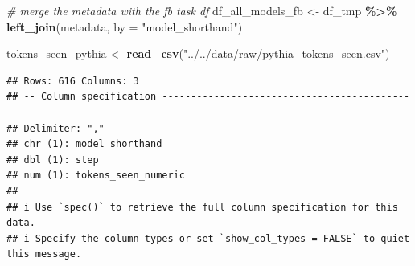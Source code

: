 \documentclass[
]{article}
\newenvironment{Shaded}{\begin{snugshade}}{\end{snugshade}}
\newcommand{\AttributeTok}[1]{\textcolor[rgb]{0.13,0.29,0.53}{#1}}
\newcommand{\CommentTok}[1]{\textcolor[rgb]{0.56,0.35,0.01}{\textit{#1}}}
\newcommand{\FunctionTok}[1]{\textcolor[rgb]{0.13,0.29,0.53}{\textbf{#1}}}
\newcommand{\NormalTok}[1]{#1}
\newcommand{\OtherTok}[1]{\textcolor[rgb]{0.56,0.35,0.01}{#1}}
\newcommand{\SpecialCharTok}[1]{\textcolor[rgb]{0.81,0.36,0.00}{\textbf{#1}}}
\newcommand{\StringTok}[1]{\textcolor[rgb]{0.31,0.60,0.02}{#1}}
\begin{document}
\begin{Shaded}
\begin{Highlighting}[]
\CommentTok{\# merge the metadata with the fb task df}
\NormalTok{df\_all\_models\_fb }\OtherTok{\textless{}{-}}\NormalTok{ df\_tmp }\SpecialCharTok{\%\textgreater{}\%} \FunctionTok{left\_join}\NormalTok{(metadata, }\AttributeTok{by =} \StringTok{"model\_shorthand"}\NormalTok{)}

\NormalTok{tokens\_seen\_pythia }\OtherTok{\textless{}{-}} \FunctionTok{read\_csv}\NormalTok{(}\StringTok{"../../data/raw/pythia\_tokens\_seen.csv"}\NormalTok{)}
\end{Highlighting}
\end{Shaded}

\begin{verbatim}
## Rows: 616 Columns: 3
## -- Column specification --------------------------------------------------------
## Delimiter: ","
## chr (1): model_shorthand
## dbl (1): step
## num (1): tokens_seen_numeric
## 
## i Use `spec()` to retrieve the full column specification for this data.
## i Specify the column types or set `show_col_types = FALSE` to quiet this message.
\end{verbatim}
\end{document}
